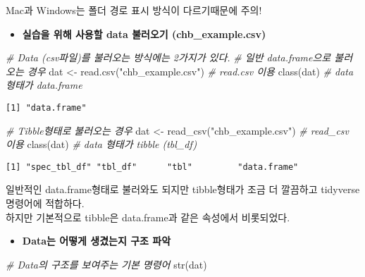 \documentclass[
]{article}
\newenvironment{Shaded}{\begin{snugshade}}{\end{snugshade}}
\newcommand{\CommentTok}[1]{\textcolor[rgb]{0.56,0.35,0.01}{\textit{#1}}}
\newcommand{\FunctionTok}[1]{\textcolor[rgb]{0.00,0.00,0.00}{#1}}
\newcommand{\NormalTok}[1]{#1}
\newcommand{\OtherTok}[1]{\textcolor[rgb]{0.56,0.35,0.01}{#1}}
\newcommand{\StringTok}[1]{\textcolor[rgb]{0.31,0.60,0.02}{#1}}
\providecommand{\tightlist}{%
  \setlength{\itemsep}{0pt}\setlength{\parskip}{0pt}}
\begin{document}
Mac과 Windows는 폴더 경로 표시 방식이 다르기때문에 주의!

\begin{itemize}
\tightlist
\item
  \textbf{실습을 위해 사용할 data 불러오기 (chb\_example.csv)}
\end{itemize}

\begin{Shaded}
\begin{Highlighting}[]
\CommentTok{\# Data (csv파일)를 불러오는 방식에는 2가지가 있다.}
\CommentTok{\# 일반 data.frame으로 불러오는 경우}
\NormalTok{dat }\OtherTok{\textless{}{-}} \FunctionTok{read.csv}\NormalTok{(}\StringTok{"chb\_example.csv"}\NormalTok{) }\CommentTok{\# read.csv 이용}
\FunctionTok{class}\NormalTok{(dat) }\CommentTok{\# data 형태가 data.frame}
\end{Highlighting}
\end{Shaded}

\begin{verbatim}
[1] "data.frame"
\end{verbatim}

\begin{Shaded}
\begin{Highlighting}[]
\CommentTok{\# Tibble형태로 불러오는 경우}
\NormalTok{dat }\OtherTok{\textless{}{-}} \FunctionTok{read\_csv}\NormalTok{(}\StringTok{"chb\_example.csv"}\NormalTok{) }\CommentTok{\# read\_csv 이용}
\FunctionTok{class}\NormalTok{(dat) }\CommentTok{\# data 형태가 tibble (tbl\_df)}
\end{Highlighting}
\end{Shaded}

\begin{verbatim}
[1] "spec_tbl_df" "tbl_df"      "tbl"         "data.frame" 
\end{verbatim}

일반적인 data.frame형태로 불러와도 되지만 tibble형태가 조금 더 깔끔하고
tidyverse 명령어에 적합하다.\\
하지만 기본적으로 tibble은 data.frame과 같은 속성에서 비롯되었다.

\begin{itemize}
\tightlist
\item
  \textbf{Data는 어떻게 생겼는지 구조 파악}
\end{itemize}

\begin{Shaded}
\begin{Highlighting}[]
\CommentTok{\# Data의 구조를 보여주는 기본 명령어}
\FunctionTok{str}\NormalTok{(dat) }
\end{Highlighting}
\end{Shaded}
\end{document}

